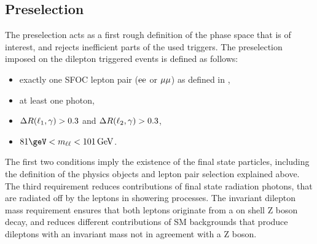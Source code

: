 \subsection{Preselection}
The preselection acts as a first rough definition of the phase space that is of interest, and rejects inefficient parts of the used triggers. The preselection imposed on the dilepton triggered events is defined as follows:
\begin{itemize}
 \item exactly one SFOC lepton pair ($\mathrm{e}\mathrm{e}$ or $\mu\mu$) as defined in ,
 \item at least one photon,
 \item $\Delta R(\ell_1,\gamma)>0.3$ and $\Delta R(\ell_2,\gamma)>0.3$,
 \item $81\geV<m_{\ell\ell}<101\GeV$.
\end{itemize}
The first two conditions imply the existence of the final state particles, including the definition of the physics objects and lepton pair selection explained above. The third requirement reduces contributions of final state radiation photons, that are radiated off by the leptons in showering processes. The invariant dilepton mass requirement ensures that both leptons originate from a on shell Z boson decay, and reduces different contributions of SM backgrounds that produce dileptons with an invariant mass not in agreement with a Z boson.
